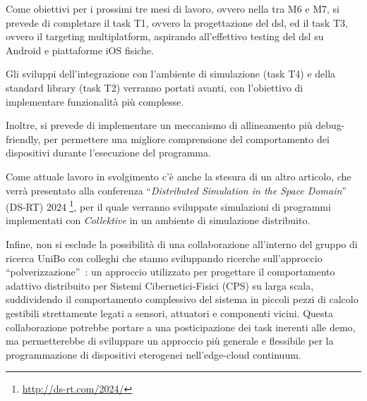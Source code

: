 \documentclass[13pt, a4paper]{scrartcl}
\newcommand{\ck}{\emph{Collektive}}
\begin{document}

Come obiettivi per i prossimi tre mesi di lavoro, ovvero nella  tra M6 e M7,
    si prevede di completare il task T1, ovvero la progettazione del \ac{dsl},
    ed il task T3, ovvero il targeting multiplatform,
    aspirando all'effettivo testing del \ac{dsl} su Android e piattaforme iOS fisiche.

Gli sviluppi dell'integrazione con l'ambiente di simulazione (task T4) e della standard library (task T2) verranno portati
    avanti, con l'obiettivo di implementare funzionalità più complesse.

Inoltre, si prevede di implementare un meccanismo di allineamento più debug-friendly,
    per permettere una migliore comprensione del comportamento dei dispositivi durante l'esecuzione del programma.

Come attuale lavoro in svolgimento c'è anche la stesura di un altro articolo, che verrà presentato alla conferenza
    ``\emph{Distributed Simulation in the Space Domain}'' (DS-RT) 2024
    \footnote{\url{http://ds-rt.com/2024/}},
    per il quale verranno sviluppate simulazioni di programmi implementati con \ck{} in un ambiente di simulazione distribuito.

Infine, non si esclude la possibilità di una collaborazione all'interno del gruppo di ricerca UniBo con colleghi che stanno sviluppando
    ricerche sull'approccio ``polverizzazione''~\cite{fi12110203}:
    un approccio utilizzato per progettare il comportamento adattivo distribuito per Sistemi Cibernetici-Fisici (CPS) su larga scala,
    suddividendo il comportamento complessivo del sistema in piccoli pezzi di calcolo gestibili strettamente legati a sensori, attuatori e componenti vicini.
%
Questa collaborazione potrebbe portare a una posticipazione dei task inerenti alle demo, ma permetterebbe di sviluppare
    un approccio più generale e flessibile per la programmazione di dispositivi eterogenei nell'edge-cloud continuum.





\end{document}
